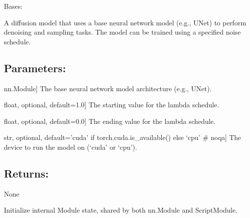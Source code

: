 \documentclass[a4paper,10pt,english]{sphinxmanual}
\begin{document}
\begin{fulllineitems}
\label{\detokenize{models:fireDiff.Models.diffusionmodel.DiffusionModel}}
\pysigstartsignatures
{}
\pysigstopsignatures
\sphinxAtStartPar
Bases: 

\sphinxAtStartPar
A diffusion model that uses a base neural network model (e.g., UNet)
to perform denoising and sampling tasks. The model can be trained using
a specified noise schedule.


\subsection{Parameters:}
\label{\detokenize{models:id18}}\begin{description}
\sphinxlineitem{model}{[}nn.Module{]}
\sphinxAtStartPar
The base neural network model architecture (e.g., UNet).

\sphinxlineitem{lambda\_start}{[}float, optional, default=1.0{]}
\sphinxAtStartPar
The starting value for the lambda schedule.

\sphinxlineitem{lambda\_end}{[}float, optional, default=0.0{]}
\sphinxAtStartPar
The ending value for the lambda schedule.

\sphinxlineitem{device}{[}str, optional, default=’cuda’ if torch.cuda.is\_available() else ‘cpu’ \# noqa{]}
\sphinxAtStartPar
The device to run the model on (‘cuda’ or ‘cpu’).

\end{description}


\subsection{Returns:}
\label{\detokenize{models:id19}}
\sphinxAtStartPar
None

\sphinxAtStartPar
Initialize internal Module state, shared by both nn.Module and ScriptModule.


\end{fulllineitems}
\end{document}
